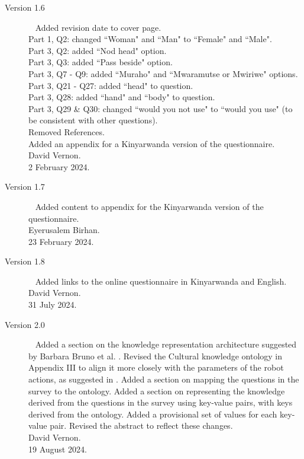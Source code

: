 \documentclass{CSSRforAfrica}
\begin{document}
\begin{description}
\item [Version 1.6]~
Added revision date to cover page.\\
Part 1, Q2: changed ``Woman" and ``Man" to ``Female" and ``Male".\\
Part 3, Q2: added ``Nod head" option.\\
Part 3, Q3: added ``Pass beside" option. \\
Part 3, Q7 - Q9: added ``Muraho" and ``Mwaramutse or Mwiriwe" options. \\
Part 3, Q21 - Q27: added ``head" to question. \\
Part 3, Q28: added ``hand" and ``body" to question.\\
Part 3, Q29 \& Q30: changed ``would you not use" to ``would you use" (to be consistent with other questions).\\
Removed References.\\
Added an appendix for a Kinyarwanda version of the questionnaire.\\
David  Vernon. \\                       
2 February 2024.   

\item [Version 1.7]~
Added content to appendix for the Kinyarwanda version of the questionnaire.\\
Eyerusalem Birhan.  \\                       
23 February 2024.   

\item [Version 1.8]~
Added links to the online questionnaire in Kinyarwanda and English.\\
David Vernon.  \\                       
31 July 2024.   

\item [Version 2.0]~
Added a section on the  knowledge  representation architecture suggested by Barbara Bruno et al. \cite{Brunoetal2019}.   Revised the Cultural knowledge ontology in Appendix III to align it more closely with the parameters of the robot actions, as suggested in \cite{Brunoetal2019}.  Added a section on mapping the questions in the survey to the ontology. Added a section on representing the knowledge derived from the questions in the survey using key-value pairs, with keys derived from the ontology. Added a provisional set of values for each key-value pair. Revised the abstract to reflect these changes. \\
David Vernon.  \\                       
19 August 2024.   


\end{description}
\end{document}
